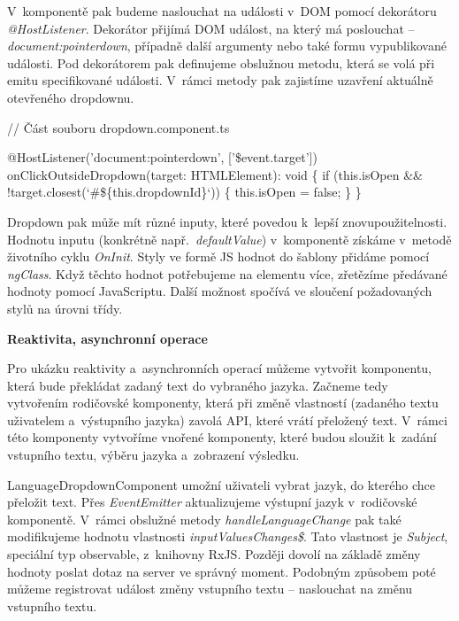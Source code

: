 V~komponentě pak budeme naslouchat na události v~DOM pomocí dekorátoru \emph{@HostListener}. 
Dekorátor přijímá DOM událost, na který má poslouchat -- \emph{document:pointerdown}, případně další argumenty nebo také formu vypublikované události. 
Pod dekorátorem pak definujeme obslužnou metodu, která se volá při emitu specifikované události. V~rámci metody pak zajistíme uzavření aktuálně otevřeného dropdownu.

\begin{prog}
// Část souboru dropdown.component.ts

@HostListener('document:pointerdown', ['\$event.target'])
onClickOutsideDropdown(target: HTMLElement): void \{
  if (this.isOpen && !target.closest(`#\$\{this.dropdownId\}`)) \{
    this.isOpen = false;
  \}
\}
\end{prog}

Dropdown pak může mít různé inputy, které povedou k~lepší znovupoužitelnosti. Hodnotu inputu (konkrétně např.~\emph{defaultValue}) v~komponentě získáme v~metodě životního cyklu \emph{OnInit}. 
Styly ve formě JS hodnot do šablony přidáme pomocí \emph{ngClass}. Když těchto hodnot potřebujeme na elementu více, zřetězíme předávané hodnoty pomocí JavaScriptu. 
Další možnost spočívá ve sloučení požadovaných stylů na úrovni třídy.

\begin{flushleft}
  \textbf{Reaktivita, asynchronní operace}
\end{flushleft}

Pro ukázku reaktivity a~asynchronních operací můžeme vytvořit komponentu, která bude překládat zadaný text do vybraného jazyka. 
Začneme tedy vytvořením rodičovské komponenty, která při změně vlastností (zadaného textu uživatelem a~výstupního jazyka) zavolá API, které vrátí přeložený text. 
V~rámci této komponenty vytvoříme vnořené komponenty, které budou sloužit k~zadání vstupního textu, výběru jazyka a~zobrazení výsledku. 

LanguageDropdownComponent umožní uživateli vybrat jazyk, do kterého chce přeložit text. 
Přes \emph{EventEmitter} aktualizujeme výstupní jazyk v~rodičovské komponentě. V~rámci obslužné metody \emph{handleLanguageChange} pak také modifikujeme hodnotu vlastnosti \emph{inputValuesChanges\$}.
Tato vlastnost je \emph{Subject}, speciální typ observable, z~knihovny RxJS. Později dovolí na základě změny hodnoty poslat dotaz na server ve správný moment. 
Podobným způsobem poté můžeme registrovat událost změny vstupního textu -- naslouchat na změnu vstupního textu.

